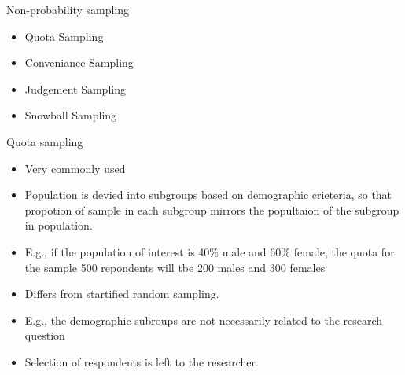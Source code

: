 \documentclass[10pt, compress]{beamer}
\begin{document}
\begin{frame}[t]{Non-probability sampling}
    \begin{itemize}
        \item Quota Sampling
        \item Conveniance Sampling
        \item Judgement Sampling
        \item Snowball Sampling
    \end{itemize}
\end{frame}

\begin{frame}[t]{Quota sampling}
    \begin{itemize}
        \item Very commonly used
        \item Population is devied into subgroups based on demographic crieteria,
        so that propotion of sample in each subgroup mirrors the popultaion of the
        subgroup in population.
        \item E.g., if the population of interest is 40\% male and 60\% female,
        the quota for the sample 500 repondents will tbe 200 males and 300 females
        \item Differs from startified random sampling.
        \item E.g., the demographic subroups are not necessarily related to the
        research question
        \item Selection of respondents is left to the researcher.
    \end{itemize}
\end{frame}
\end{document}
